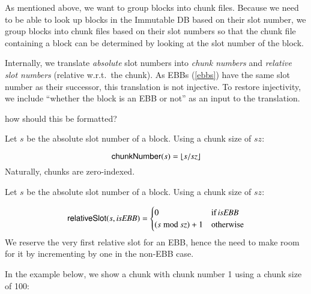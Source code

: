 As mentioned above, we want to group blocks into chunk files. Because we need to
be able to look up blocks in the Immutable DB based on their slot number, we
group blocks into chunk files based on their slot numbers so that the chunk file
containing a block can be determined by looking at the slot number of the block.

Internally, we translate \emph{absolute} slot numbers into \emph{chunk numbers}
and \emph{relative slot numbers} (relative w.r.t.\ the chunk). As EBBs
(\cref{ebbs}) have the same slot number as their successor, this translation is
not injective. To restore injectivity, we include ``whether the block is an EBB
or not'' as an input to the translation.

 how should this be formatted?

\begin{definition}
  Let $s$ be the absolute slot number of a block. Using a chunk size of
  $\mathit{sz}$:

  \[
  \mathsf{chunkNumber}(s) = \lfloor s / \mathit{sz} \rfloor
  \]
  Naturally, chunks are zero-indexed.

\end{definition}

\begin{definition}
  Let $s$ be the absolute slot number of a block. Using a chunk size of
  $\mathit{sz}$:

  \[
  \mathsf{relativeSlot}(s, \mathit{isEBB}) =
  \begin{cases}
    0                         & \text{if}\,\mathit{isEBB} \\
    (s \bmod \mathit{sz}) + 1 & \text{otherwise}
  \end{cases}
  \]
  We reserve the very first relative slot for an EBB, hence the need to make
  room for it by incrementing by one in the non-EBB case.
\end{definition}

In the example below, we show a chunk with chunk number 1 using a chunk size of
100:

